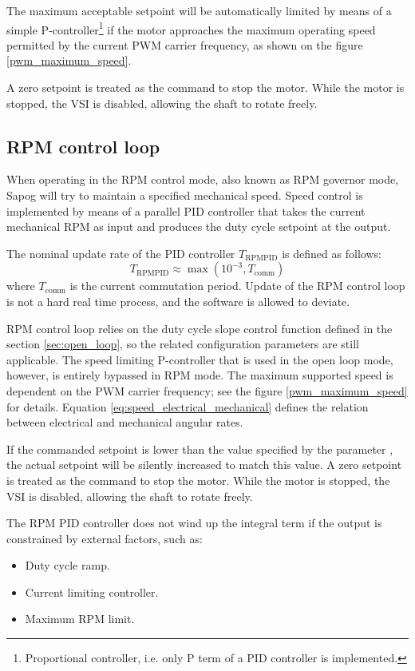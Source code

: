 \documentclass{zubaxdoc}
\begin{document}
The maximum acceptable setpoint will be automatically limited by means of a simple
P-controller\footnote{Proportional controller, i.e. only P term of a PID controller is implemented.}
if the motor approaches the maximum operating speed permitted by the
current PWM carrier frequency, as shown on the figure \ref{pwm_maximum_speed}.

A zero setpoint is treated as the command to stop the motor.
While the motor is stopped, the VSI is disabled, allowing the shaft to rotate freely.

\subsection{RPM control loop}\label{sec:rpm_loop}

When operating in the RPM control mode, also known as RPM governor mode,
Sapog will try to maintain a specified mechanical speed.
Speed control is implemented by means of a parallel PID controller
that takes the current mechanical RPM as input and
produces the duty cycle setpoint at the output.

The nominal update rate of the PID controller $T_{\text{RPMPID}}$ is defined as follows:
\begin{equation}\label{eq:rpm_pid_control_loop_period}
T_{\text{RPMPID}} \approx \max \left(10^{-3},T_{\text{comm}}\right)
\end{equation}
where $T_\text{comm}$ is the current commutation period.
Update of the RPM control loop is not a hard real time process, and the software is allowed to
deviate.

RPM control loop relies on the duty cycle slope control function defined in the section \ref{sec:open_loop},
so the related configuration parameters are still applicable.
The speed limiting P-controller that is used in the open loop mode, however,
is entirely bypassed in RPM mode.
The maximum supported speed is dependent on the PWM carrier frequency;
see the figure \ref{pwm_maximum_speed} for details.
Equation \ref{eq:speed_electrical_mechanical} defines the relation between electrical
and mechanical angular rates.

If the commanded setpoint is lower than the value specified by the parameter \mbox{,}
the actual setpoint will be silently increased to match this value.
A zero setpoint is treated as the command to stop the motor.
While the motor is stopped, the VSI is disabled, allowing the shaft to rotate freely.

The RPM PID controller does not wind up the integral term if the output is constrained by external factors,
such as:
\begin{itemize}
\item Duty cycle ramp.
\item Current limiting controller.
\item Maximum RPM limit.
\end{itemize}
\end{document}
